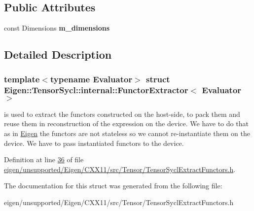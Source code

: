 \subsection*{Public Attributes}
\begin{DoxyCompactItemize}
\item 
\mbox{\label{struct_eigen_1_1_tensor_sycl_1_1internal_1_1_functor_extractor_a9bf1a9794ad637ddbb9dfee947814850}} 
const Dimensions {\bfseries m\+\_\+dimensions}
\end{DoxyCompactItemize}


\subsection{Detailed Description}
\subsubsection*{template$<$typename Evaluator$>$\newline
struct Eigen\+::\+Tensor\+Sycl\+::internal\+::\+Functor\+Extractor$<$ Evaluator $>$}

is used to extract the functors constructed on the host-\/side, to pack them and reuse them in reconstruction of the expression on the device. We have to do that as in \hyperlink{namespace_eigen}{Eigen} the functors are not stateless so we cannot re-\/instantiate them on the device. We have to pass instantiated functors to the device. 

Definition at line \hyperlink{eigen_2unsupported_2_eigen_2_c_x_x11_2src_2_tensor_2_tensor_sycl_extract_functors_8h_source_l00036}{36} of file \hyperlink{eigen_2unsupported_2_eigen_2_c_x_x11_2src_2_tensor_2_tensor_sycl_extract_functors_8h_source}{eigen/unsupported/\+Eigen/\+C\+X\+X11/src/\+Tensor/\+Tensor\+Sycl\+Extract\+Functors.\+h}.



The documentation for this struct was generated from the following file\+:\begin{DoxyCompactItemize}
\item 
eigen/unsupported/\+Eigen/\+C\+X\+X11/src/\+Tensor/\+Tensor\+Sycl\+Extract\+Functors.\+h\end{DoxyCompactItemize}
